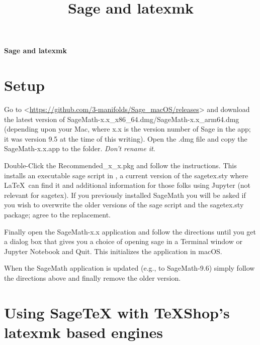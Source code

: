 \documentclass[11pt]{article}
\title{\textsf{Sage} and \textsf{latexmk}}
\author{}
\newcommand{\TS}{\textsf{\TeX Shop}}
\begin{document}
\begin{center}
\Large\bfseries\textsf{Sage} and \textsf{latexmk}
\end{center}

\section{Setup}

Go to <\url{https://github.com/3-manifolds/Sage_macOS/releases}> and download the latest version of \textsf{SageMath-x.x\_x86\_64.dmg}/\textsf{SageMath-x.x\_arm64.dmg} (depending upon your Mac, where x.x is the version number of \textsf{Sage} in the app; it was version 9.5 at the time of this writing). Open the \textsf{.dmg} file and copy the \textsf{SageMath-x.x.app} to the  folder. \emph{Don't rename it}.

Double-Click the \textsf{Recommended\_x\_x.pkg} and follow the instructions. This installs an executable \textsf{sage} script in , a current version of the \textsf{sagetex.sty} where \LaTeX\ can find it and additional information for those folks using \textsf{Jupyter} (not relevant for \textsf{sagetex}). If you previously installed \textsf{SageMath} you will be asked if you wish to overwrite the older versions of the \textsf{sage} script and the \textsf{sagetex.sty} package; agree to the replacement.


Finally open the \textsf{SageMath-x.x} application and follow the directions until you get a dialog box that gives you a choice of opening sage in a \textsf{Terminal} window or \textsf{Jupyter Notebook} and \textsf{Quit}. This initializes the application in \textsf{macOS}.

When the \textsf{SageMath} application is updated (e.g., to \textsf{SageMath-9.6}) simply follow the directions above and finally remove the older version.

\section{Using \textsf{SageTeX} with \TS's \textsf{latexmk} based engines}
\end{document}
